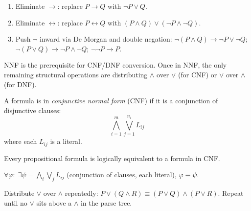 \begin{remark}
\begin{enumerate}
  \item Eliminate $\rightarrow$: replace $P \rightarrow Q$ with $\neg P \vee Q$.
  \item Eliminate $\leftrightarrow$: replace $P \leftrightarrow Q$ with
        $(P \wedge Q) \vee (\neg P \wedge \neg Q)$.
  \item Push $\neg$ inward via De Morgan and double negation:
        $\neg(P \wedge Q) \to \neg P \vee \neg Q$;\quad
        $\neg(P \vee Q) \to \neg P \wedge \neg Q$;\quad
        $\neg\neg P \to P$.
\end{enumerate}
\end{remark}

\begin{remark}
NNF is the prerequisite for CNF/DNF conversion. Once in NNF, the only remaining
structural operations are distributing $\wedge$ over $\vee$ (for CNF) or
$\vee$ over $\wedge$ (for DNF).
\end{remark}

\begin{tcolorbox}[colback=propbox, colframe=propborder, arc=2pt,
  left=6pt, right=6pt, top=4pt, bottom=4pt,
  title={\small\textbf{Definition (Conjunctive Normal Form — CNF)}},
  fonttitle=\small\bfseries]
\label{def:cnf}
A formula is in \emph{conjunctive normal form} (CNF) if it is a conjunction of
disjunctive clauses:
\[
\bigwedge_{i=1}^{m} \bigvee_{j=1}^{n_i} L_{ij}
\]
where each $L_{ij}$ is a literal.
\end{tcolorbox}

\begin{proposition}
\label{prop:cnf-exists}
Every propositional formula is logically equivalent to a formula in CNF.
\end{proposition}

\begin{remark*}
$\forall\varphi:\; \exists\psi = \bigwedge_i \bigvee_j L_{ij}$ (conjunction of clauses, each literal),\; $\varphi \equiv \psi$.
\end{remark*}


\begin{remark}
Distribute $\vee$ over $\wedge$ repeatedly:
$P \vee (Q \wedge R) \equiv (P \vee Q) \wedge (P \vee R)$.
Repeat until no $\vee$ sits above a $\wedge$ in the parse tree.
\end{remark}

